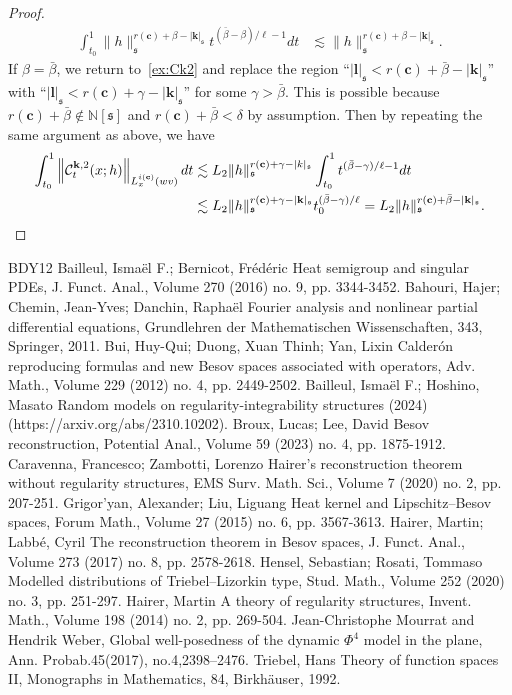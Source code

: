 \documentclass[10pt]{amsart}
\theoremstyle{definition}
\numberwithin{equation}{section}
\newcommand{\bbN}{\mathbb{N}}
\newcommand{\mfs}{\mathfrak{s}}
\newcommand{\bfc}{\mathbf{c}}
\newcommand{\bfk}{\mathbf{k}}
\newcommand{\bfl}{\mathbf{l}}
\newcommand{\mcC}{\mathcal{C}}
\begin{document}
\begin{proof}
\begin{align*}
\int_{t_0}^1\|h\|_{\mfs}^{r(\bfc)+\beta-|{\bfk}|_\mfs}t^{(\bar\beta-\beta)/\ell-1}dt &\lesssim\|h\|_{\mfs}^{r(\bfc)+\beta-|{\bfk}|_\mfs}.
\end{align*}
If $\beta=\bar\beta$, we return to~\eqref{ex:Ck2} and replace the region ``$|{\bfl}|_\mfs<r(\bfc)+\bar\beta-|{\bfk}|_\mfs$'' with ``$|{\bfl}|_\mfs<r(\bfc)+\gamma-|{\bfk}|_\mfs$'' for some $\gamma>\bar\beta$. This is possible because $r(\bfc)+\bar\beta\notin\bbN[\mfs]$ and $r(\bfc)+\bar\beta<\delta$ by assumption. Then by repeating the same argument as above, we have
\begin{align*}
\int_{t_0}^1\left\|\mcC_t^{{\bfk},2}(x;h)\right\|_{L_x^{i(\bfc)}(wv)}dt &\lesssim L_2\|h\|_{\mfs}^{r(\bfc)+\gamma-|k|_{\mfs}}\int_{t_0}^1t^{(\bar\beta-\gamma)/\ell-1}dt\\
&\lesssim L_2\|h\|_{\mfs}^{r(\bfc)+\gamma-|{\bfk}|_\mfs}t_0^{(\bar\beta-\gamma)/\ell} =L_2\|h\|_\mfs^{r(\bfc)+\bar\beta-|{\bfk}|_\mfs}.\qedhere
\end{align*}
\end{proof}

\begin{thebibliography}{BDY12}
 Bailleul, Ismaël F.; Bernicot, Frédéric Heat semigroup and singular PDEs, J. Funct. Anal., Volume 270 (2016) no. 9, pp. 3344-3452.
 Bahouri, Hajer; Chemin, Jean-Yves; Danchin, Raphaël Fourier analysis and nonlinear partial differential equations, Grundlehren der Mathematischen Wissenschaften, 343, Springer, 2011.
 Bui, Huy-Qui; Duong, Xuan Thinh; Yan, Lixin Calderón reproducing formulas and new Besov spaces associated with operators, Adv. Math., Volume 229 (2012) no. 4, pp. 2449-2502.
 Bailleul, Ismaël F.; Hoshino, Masato Random models on regularity-integrability structures (2024) (https://arxiv.org/abs/2310.10202).
 Broux, Lucas; Lee, David Besov reconstruction, Potential Anal., Volume 59 (2023) no. 4, pp. 1875-1912.
 Caravenna, Francesco; Zambotti, Lorenzo Hairer’s reconstruction theorem without regularity structures, EMS Surv. Math. Sci., Volume 7 (2020) no. 2, pp. 207-251.
 Grigor’yan, Alexander; Liu, Liguang Heat kernel and Lipschitz–Besov spaces, Forum Math., Volume 27 (2015) no. 6, pp. 3567-3613.
 Hairer, Martin; Labbé, Cyril The reconstruction theorem in Besov spaces, J. Funct. Anal., Volume 273 (2017) no. 8, pp. 2578-2618.
 Hensel, Sebastian; Rosati, Tommaso Modelled distributions of Triebel–Lizorkin type, Stud. Math., Volume 252 (2020) no. 3, pp. 251-297.
 Hairer, Martin A theory of regularity structures, Invent. Math., Volume 198 (2014) no. 2, pp. 269-504.
 Jean-Christophe Mourrat and Hendrik Weber, Global well-posedness of the dynamic $\Phi^4$ model in the plane, Ann. Probab.45(2017), no.4,2398–2476.
 Triebel, Hans Theory of function spaces II, Monographs in Mathematics, 84, Birkhäuser, 1992.
\end{thebibliography}
\end{document}
